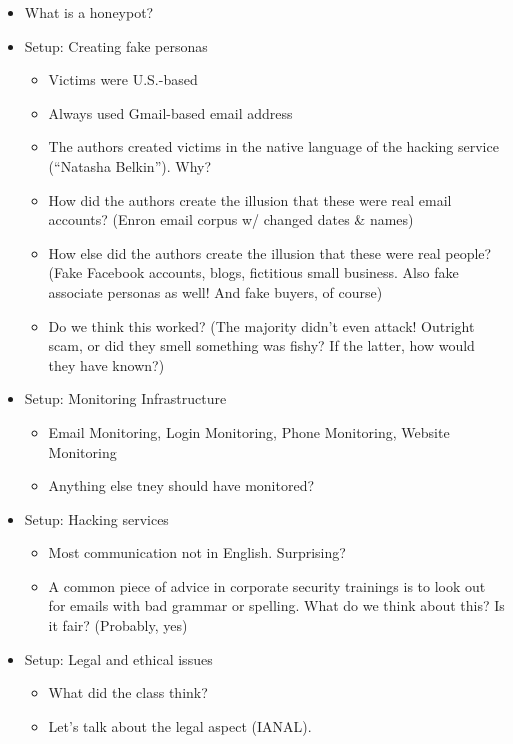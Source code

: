 \documentclass[11pt]{article}
\begin{document}
    \begin{itemize}
        \item What is a honeypot?
        \item Setup: Creating fake personas
        \begin{itemize}
            \item Victims were U.S.-based
            \item Always used Gmail-based email address 
            \item The authors created victims in the native language of the hacking service (``Natasha Belkin''). Why?
            \item How did the authors create the illusion that these were real email accounts? (Enron email corpus w/ changed dates \& names)
            \item How else did the authors create the illusion that these were real people? (Fake Facebook accounts, blogs, fictitious small business. Also fake associate personas as well! And fake buyers, of course)
            \item Do we think this worked? (The majority didn't even attack! Outright scam, or did they smell something was fishy? If the latter, how would they have known?)
        \end{itemize}
        \item Setup: Monitoring Infrastructure
        \begin{itemize}
            \item Email Monitoring, Login Monitoring, Phone Monitoring, Website Monitoring
            \item Anything else tney should have monitored?
        \end{itemize}
        \item Setup: Hacking services
        \begin{itemize}
            \item Most communication not in English. Surprising?
            \item A common piece of advice in corporate security trainings is to look out for emails with bad grammar or spelling. What do we think about this? Is it fair? (Probably, yes)
        \end{itemize}
        \item Setup: Legal and ethical issues
        \begin{itemize}
            \item What did the class think?
            \item Let's talk about the legal aspect (IANAL). 

\end{itemize}
\end{itemize}
\end{document}
